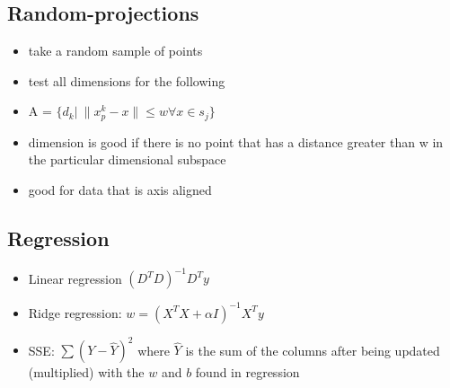 \documentclass[11pt]{article}
\begin{document}
\subsection*{Random-projections}
\label{sec:orgf9193c2}
\begin{itemize}
\item take a random sample of points
\item test all dimensions for the following
\item A = \(\{d_k| \: \|x_p^k - x\| \le w \forall x \in s_j\}\)
\item dimension is good if there is no point that has a distance greater than w in
the particular dimensional subspace
\item good for data that is axis aligned
\end{itemize}
\subsection*{Regression}
\label{sec:org677f851}
\begin{itemize}
\item Linear regression \((D^TD)^{-1}D^Ty\)
\item Ridge regression:  \(w = (X^TX + \alpha I)^{-1}X^Ty\)
\item SSE: \(\sum(Y-\hat Y)^2\) where \(\hat Y\) is the sum of the columns after being
updated (multiplied) with the \(w\) and \(b\) found in regression
\end{itemize}
\end{document}
